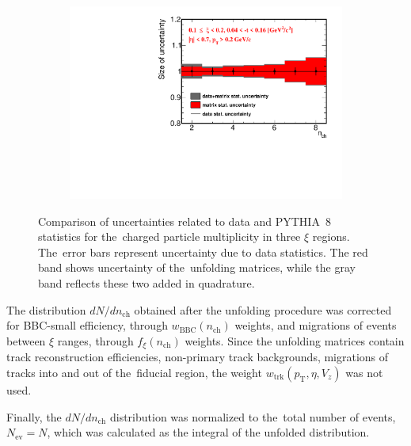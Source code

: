 \begin{figure}[h!]
\begin{subfigure}{.49\textwidth}
		\includegraphics[width=\textwidth,page=1]{chapters/chrgSTAR/img/unfolding/matrix_stat_2.pdf}
	\end{subfigure}
	\begin{minipage}{.49\textwidth}
		\caption{Comparison of  uncertainties  related to data and PYTHIA~8 statistics  for the~charged particle multiplicity in three $\xi$ regions. 
		The~error bars represent uncertainty due to  data
		statistics. The red band shows uncertainty of the~unfolding matrices, while the gray band reflects these two added in quadrature.}
		\label{fig:responseSTAR_uncert}
	\end{minipage}
\end{figure}

The distribution $dN/dn_\textrm{ch}$ obtained after the unfolding procedure
was corrected for BBC-small efficiency, through $w_\textrm{BBC}(n_\textrm{ch})$ weights, and migrations of events between $\xi$ ranges, through $f_{\xi}(n_\textrm{ch})$ weights. Since the unfolding matrices contain track reconstruction efficiencies, non-primary track backgrounds, migrations of tracks into and out of the~fiducial region, the weight $w_\textrm{trk}\left(p_\textrm{T},\eta,V_{z}\right)$ was not used.

\hspace{\parindent} Finally, the $dN/dn_\textrm{ch}$ distribution was normalized to the~total number of events, $N_\textrm{ev}=N$, which was calculated as the integral of the unfolded  distribution.



